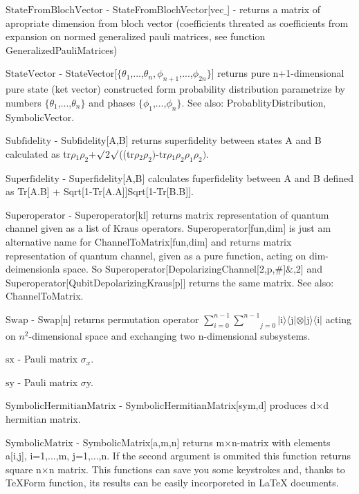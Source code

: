 \documentclass[a4paper,12pt]{article}
\begin{document}
\textbf{$ \text{StateFromBlochVector} $ } - StateFromBlochVector[vec$\_$] - returns a matrix of apropriate dimension from bloch vector (coefficients threated as coefficients from expansion on normed generalized pauli matrices, see function GeneralizedPauliMatrices)$  $

\textbf{$ \text{StateVector} $ } - StateVector[$\{$$ \theta _1 $,...,$ \theta _n,\phi _{n+1} $,...,$ \phi _{2 n} $$\}$] returns pure n+1-dimensional pure state (ket vector) constructed form probability distribution parametrize by numbers $\{$$ \theta _1 $,...,$ \theta _n $$\}$ and phases $\{$$ \phi _1 $,...,$ \phi _n $$\}$. See also: ProbablityDistribution, SymbolicVector.$  $

\textbf{$ \text{Subfidelity} $ } - Subfidelity[A,B] returns superfidelity between states A and B calculated as $  $tr$\rho $$ _1\rho _2 $+$\surd $2$\surd $(($  $tr$\rho $$ _2\rho _2\text{)-} $tr$\rho $$ _1\rho _2\rho _1\rho _2\text{).} $

\textbf{$ \text{Superfidelity} $ } - Superfidelity[A,B] calculates fuperfidelity between A and B defined as Tr[A.B] + Sqrt[1-Tr[A.A]]Sqrt[1-Tr[B.B]].$  $

\textbf{$ \text{Superoperator} $ } - Superoperator[kl] returns matrix representation of quantum channel given as a list of Kraus operators. Superoperator[fun,dim] is just am alternative name for ChannelToMatrix[fun,dim] and returns matrix representation of quantum channel, given as a pure function, acting on dim-deimensionla space. So Superoperator[DepolarizingChannel[2,p,$\#$]$\&$,2] and Superoperator[QubitDepolarizingKraus[p]] returns the same matrix. See also: ChannelToMatrix.$  $

\textbf{$ \text{Swap} $ } - Swap[n] returns permutation operator $ \sum _{i=0}^{n-1} \underset{j=0}{\overset{n-1}{ \sum }} $$|$i$\rangle \langle $j$|\otimes |$j$\rangle \langle $i$|$ acting on $ n^2 $-dimensional space and exchanging two n-dimensional subsystems.$  $

\textbf{$ \text{sx} $ } - Pauli matrix $ \sigma _x. $

\textbf{$ \text{sy} $ } - Pauli matrix $\sigma $y.$  $

\textbf{$ \text{SymbolicHermitianMatrix} $ } - SymbolicHermitianMatrix[sym,d] produces d$\times $d hermitian matrix.$  $

\textbf{$ \text{SymbolicMatrix} $ } - SymbolicMatrix[a,m,n] returns m$\times $n-matrix with elements a[i,j], i=1,...,m, j=1,...,n. If the second argument is ommited this function returns square n$\times $n matrix. This functions can save you some keystrokes and, thanks to TeXForm function, its results can be easily incorporeted in LaTeX documents.$  $
\end{document}
